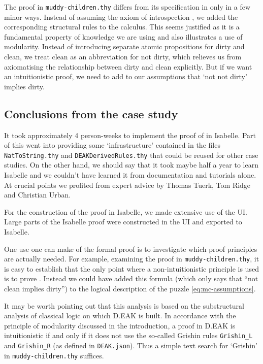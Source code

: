 \documentclass[runningheads,a4paper]{llncs}
\begin{document}
\medskip\noindent The proof in \texttt{muddy-children.thy} differs from its specification in \cite{MaPS14} only in a few minor ways. Instead of assuming the axiom of introspection , we added the corresponding structural rules to the calculus. This seems justified as it is a fundamental property of knowledge we are using and also illustrates a use of modularity. Instead of introducing separate atomic propositions for dirty and clean, we treat clean as an abbreviation for not dirty, which relieves us from axiomatising the relationship between dirty and clean explicitly. But if we want an intuitionistic proof, we need to add to our assumptions that `not not dirty' implies dirty.


\subsection{Conclusions from the case study}
It took approximately 4 person-weeks to implement the proof of \cite[Prop.24]{MaPS14} in Isabelle. Part of this went into providing some `infrastructure' contained in the files \texttt{NatToString.thy} and \texttt{DEAKDerivedRules.thy} that could be reused for other case studies. On the other hand, we should say that it took maybe half a year to learn Isabelle and we couldn't have learned it from documentation and tutorials alone. At crucial points we profited from expert advice by Thomas Tuerk, Tom Ridge and Christian Urban.

For the construction of the proof in Isabelle, we made extensive use of the UI. Large parts of the Isabelle proof were constructed in the UI and exported to Isabelle.

One use one can make of the formal proof is to investigate which proof principles are actually needed. For example, examining the proof in \texttt{muddy-children.thy}, it is easy to establish that the only point where a non-intuitionistic principle is used is to prove . Instead we could have added this formula (which only says that ``not clean implies dirty'') to the logical description of the puzzle \eqref{eq:mc-assumptions}.

It may be worth pointing out that this analysis is based on the substructural analysis of classical logic on which D.EAK is built. In accordance with the principle of modularity discussed in the introduction, a proof in D.EAK is intuitionistic if and only 
if it does not use the so-called Grishin rules \texttt{Grishin\_L} and \texttt{Grishin\_R} (as defined in \texttt{DEAK.json}). Thus a simple text search for `Grishin' in \texttt{muddy-children.thy} suffices.
\end{document}
